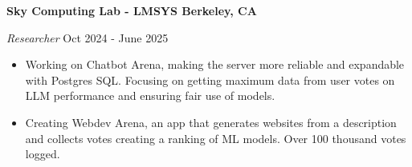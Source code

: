 \textbf{Sky Computing Lab - LMSYS \hfill Berkeley, CA}\par
\textit{Researcher} \hfill Oct 2024 - June 2025
\begin{itemize}
\item Working on Chatbot Arena, making the server more reliable and expandable with Postgres SQL. Focusing on getting maximum data from user votes on LLM performance and ensuring fair use of models.
\item Creating Webdev Arena, an app that generates websites from a description and collects votes creating a ranking of ML models. Over 100 thousand votes logged.
\end{itemize}\par